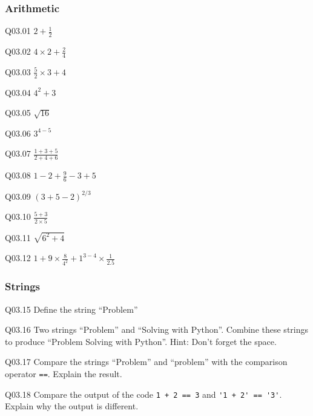 \documentclass{book}
\newenvironment{problems}{}{}  %
\newcommand{\passthrough}[1]{#1}
\begin{document}
    
        \begin{problems}
        \hypertarget{arithmetic}{%
\subsubsection{Arithmetic}\label{arithmetic}}

Q03.01 \(2 + \frac{1}{2}\)

Q03.02 \(4 \times 2 + \frac{2}{4}\)

Q03.03 \(\frac{5}{2} \times 3 + 4\)

Q03.04 \(4^2 + 3\)

Q03.05 \(\sqrt{16}\)

Q03.06 \(3^{4-5}\)

Q03.07 \(\frac{1+3+5}{2+4+6}\)

Q03.08 \(1 - 2 + \frac{9}{6} -3 + 5\)

Q03.09 \((3 + 5 -2)^{2/3}\)

Q03.10 \(\frac{5+3}{2 \times 5}\)

Q03.11 \(\sqrt{6^2 + 4}\)

Q03.12 \(1 + 9 \times \frac{8}{4^2} + 1^{3-4} \times \frac{1}{2.5}\)
        \end{problems}

    




    
        \hypertarget{strings}{%
\subsubsection{Strings}\label{strings}}

Q03.15 Define the string ``Problem''

Q03.16 Two strings ``Problem'' and ``Solving with Python''. Combine
these strings to produce ``Problem Solving with Python''. Hint: Don't
forget the space.

Q03.17 Compare the strings ``Problem'' and ``problem'' with the
comparison operator \passthrough{\lstinline!==!}. Explain the result.

Q03.18 Compare the output of the code
\passthrough{\lstinline!1 + 2 == 3!} and
\passthrough{\lstinline!'1 + 2' == '3'!}. Explain why the output is
different.
    
\end{document}
